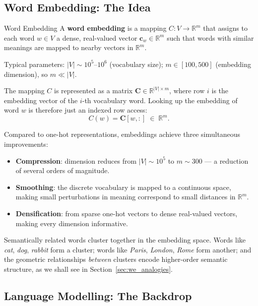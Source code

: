 \documentclass[11pt,a4paper]{article}
\newcommand{\term}[1]{\textcolor{DefGreen}{\textbf{#1}}\index{#1}}
\begin{document}
\subsection{Word Embedding: The Idea}
\label{sec:we_idea}

\begin{defbox}{Word Embedding}
A \term{word embedding} is a mapping $C: V \to \mathbb{R}^m$ that assigns to each word $w \in V$ a dense, real-valued vector $\mathbf{c}_w \in \mathbb{R}^m$ such that words with similar meanings are mapped to nearby vectors in $\mathbb{R}^m$.

Typical parameters: $|V| \sim 10^5$--$10^6$ (vocabulary size); $m \in [100, 500]$ (embedding dimension), so $m \ll |V|$.
\end{defbox}

The mapping $C$ is represented as a matrix $\mathbf{C} \in \mathbb{R}^{|V| \times m}$, where row $i$ is the embedding vector of the $i$-th vocabulary word. Looking up the embedding of word $w$ is therefore just an indexed row access:
\[
  C(w) = \mathbf{C}[w, :] \;\in\; \mathbb{R}^m.
\]

Compared to one-hot representations, embeddings achieve three simultaneous improvements:
\begin{itemize}
  \item \textbf{Compression}: dimension reduces from $|V| \sim 10^5$ to $m \sim 300$ — a reduction of several orders of magnitude.
  \item \textbf{Smoothing}: the discrete vocabulary is mapped to a continuous space, making small perturbations in meaning correspond to small distances in $\mathbb{R}^m$.
  \item \textbf{Densification}: from sparse one-hot vectors to dense real-valued vectors, making every dimension informative.
\end{itemize}

Semantically related words cluster together in the embedding space. Words like \textit{cat}, \textit{dog}, \textit{rabbit} form a cluster; words like \textit{Paris}, \textit{London}, \textit{Rome} form another; and the geometric relationships \emph{between} clusters encode higher-order semantic structure, as we shall see in Section~\ref{sec:we_analogies}.

\subsection{Language Modelling: The Backdrop}
\label{sec:we_langmodel}
\end{document}
